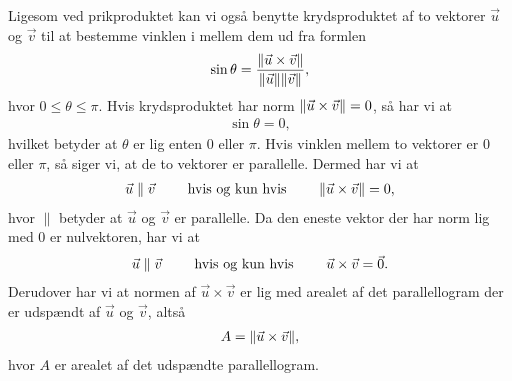 Ligesom ved prikproduktet kan vi også benytte krydsproduktet af to vektorer $\vec{u}$ og $\vec{v}$ til at bestemme vinklen i mellem dem ud fra formlen
\begin{align}\label{eq:vec3d1vinkelvedkrydsprodukt}
\sin \theta = \frac{\Vert \vec{u} \times \vec{v}\Vert}{\Vert \vec{u}\Vert\Vert \vec{v}\Vert},
\end{align}
hvor $0\leq\theta\leq\pi$. Hvis krydsproduktet har norm $\Vert \vec{u} \times \vec{v}\Vert=0$, så har vi at 
\begin{align*}
\sin \theta = 0,
\end{align*}
hvilket betyder at $\theta$ er lig enten $0$ eller $\pi$. Hvis vinklen mellem to vektorer er $0$ eller $\pi$, så siger vi, at de to vektorer er parallelle. Dermed har vi at 
\begin{align*}
\vec{u} \parallel \vec{v} \qquad \textup{ hvis og kun hvis } \qquad \Vert \vec{u} \times \vec{v}\Vert = 0,
\end{align*}
hvor $\parallel$ betyder at $\vec{u}$ og $\vec{v}$ er parallelle. Da den eneste vektor der har norm lig med $0$ er nulvektoren, har vi at
\begin{align*}
\vec{u} \parallel \vec{v} \qquad \textup{ hvis og kun hvis } \qquad \vec{u} \times \vec{v} = \vec{0}.
\end{align*}
Derudover har vi at normen af $\vec{u} \times \vec{v}$ er lig med arealet af det parallellogram der er udspændt af $\vec{u}$ og $\vec{v}$, altså
\begin{align*}
A = \Vert \vec{u} \times \vec{v}\Vert,
\end{align*}
hvor $A$ er arealet af det udspændte parallellogram.

